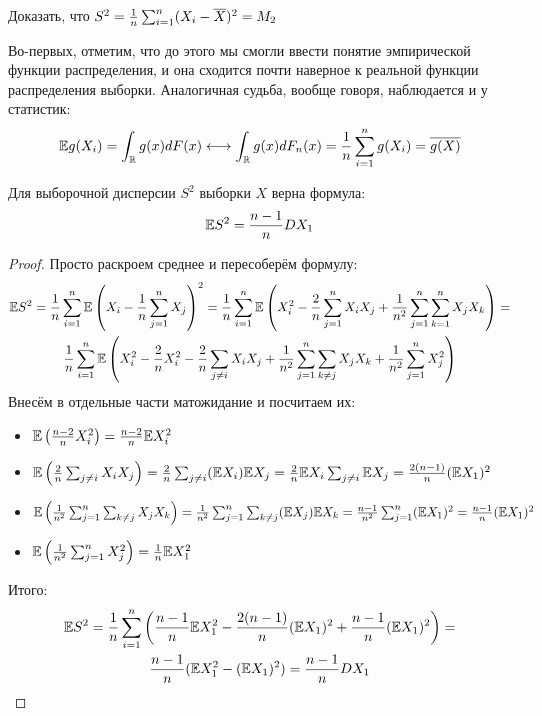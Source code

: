 \begin{exercise}
	Доказать, что $S^2 = \frac{1}{n} \sum_{i = 1}^n (X_i - \overline{X})^2 = M_2$
\end{exercise}

\begin{note}
	Во-первых, отметим, что до этого мы смогли ввести понятие эмпирической функции распределения, и она сходится почти наверное к реальной функции распределения выборки. Аналогичная судьба, вообще говоря, наблюдается и у статистик:
	\[
		\mathbb{E} g(X_i) = \int_{\mathbb{R}} g(x)dF(x) \longleftrightarrow \int_{\mathbb{R}} g(x)dF_n(x) = \frac{1}{n} \sum_{i = 1}^n g(X_i) = \overline{g(X)}
	\]
\end{note}

\begin{proposition}
	Для выборочной дисперсии $S^2$ выборки $X$ верна формула:
	\[
		\mathbb{E} S^2 = \frac{n - 1}{n} DX_1
	\]
\end{proposition}

\begin{proof}
	Просто раскроем среднее и пересоберём формулу:
	\begin{multline*}
		\mathbb{E} S^2 = \frac{1}{n} \sum_{i = 1}^n \mathbb{E}\left(X_i - \frac{1}{n}\sum_{j = 1}^n X_j\right)^2 = \frac{1}{n} \sum_{i = 1}^n \mathbb{E}\left(X_i^2 - \frac{2}{n}\sum_{j = 1}^n X_iX_j + \frac{1}{n^2}\sum_{j = 1}^n \sum_{k = 1}^n X_jX_k\right) =
		\\
		\frac{1}{n} \sum_{i = 1}^n \mathbb{E}\left(X_i^2 - \frac{2}{n}X_i^2 - \frac{2}{n} \sum_{j \neq i} X_iX_j + \frac{1}{n^2} \sum_{j = 1}^n \sum_{k \neq j} X_jX_k + \frac{1}{n^2} \sum_{j = 1}^n X_j^2\right)
	\end{multline*}
	Внесём в отдельные части матожидание и посчитаем их:
	\begin{itemize}
		\item $\mathbb{E}\left(\frac{n - 2}{n}X_i^2\right) = \frac{n - 2}{n}\mathbb{E} X_i^2$
		
		\item $\mathbb{E}\left(\frac{2}{n}\sum_{j \neq i} X_iX_j\right) = \frac{2}{n}\sum_{j \neq i} (\mathbb{E} X_i)\mathbb{E} X_j = \frac{2}{n} \mathbb{E} X_i \sum_{j \neq i} \mathbb{E} X_j = \frac{2(n - 1)}{n} (\mathbb{E} X_1)^2$
		
		\item $\mathbb{E}\left(\frac{1}{n^2} \sum_{j = 1}^n \sum_{k \neq j} X_jX_k\right) = \frac{1}{n^2} \sum_{j = 1}^n \sum_{k \neq j} (\mathbb{E} X_j)\mathbb{E} X_k = \frac{n - 1}{n^2} \sum_{j = 1}^n (\mathbb{E} X_1)^2 = \frac{n - 1}{n} (\mathbb{E} X_1)^2$
		
		\item $\mathbb{E}\left(\frac{1}{n^2} \sum_{j = 1}^n X_j^2\right) = \frac{1}{n} \mathbb{E} X_1^2$
	\end{itemize}
	Итого:
	\begin{multline*}
		\mathbb{E} S^2 = \frac{1}{n} \sum_{i = 1}^n \left(\frac{n - 1}n \mathbb{E} X_1^2 - \frac{2(n - 1)}{n}(\mathbb{E} X_1)^2 + \frac{n - 1}{n}(\mathbb{E} X_1)^2\right) =
		\\
		\frac{n - 1}{n} (\mathbb{E} X_1^2 - (\mathbb{E} X_1)^2) = \frac{n - 1}{n} DX_1
	\end{multline*}
\end{proof}

